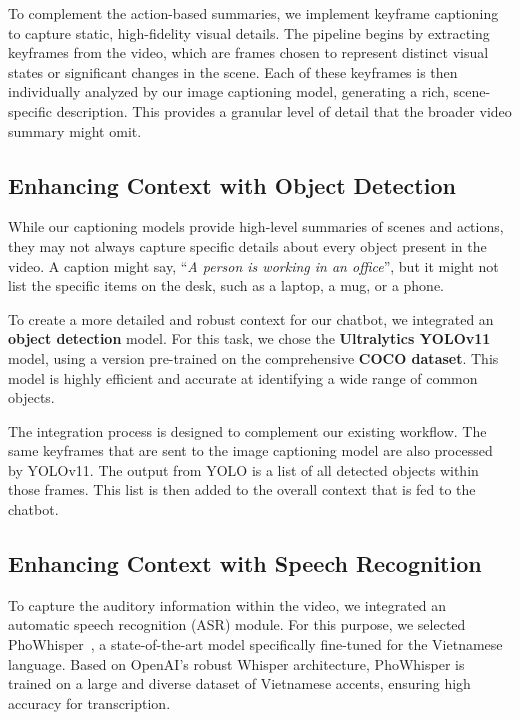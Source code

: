 To complement the action-based summaries, we implement keyframe captioning to capture static, high-fidelity visual details. The pipeline begins by extracting keyframes from the video, which are frames chosen to represent distinct visual states or significant changes in the scene. Each of these keyframes is then individually analyzed by our image captioning model, generating a rich, scene-specific description. This provides a granular level of detail that the broader video summary might omit.


\subsection{Enhancing Context with Object Detection}

While our captioning models provide high-level summaries of scenes and actions, they may not always capture specific details about every object present in the video. A caption might say, ``\textit{A person is working in an office}'', but it might not list the specific items on the desk, such as a laptop, a mug, or a phone.

To create a more detailed and robust context for our chatbot, we integrated an \textbf{object detection} model. For this task, we chose the \textbf{Ultralytics YOLOv11}~\cite{yolo11_ultralytics} model, using a version pre-trained on the comprehensive \textbf{COCO dataset}. This model is highly efficient and accurate at identifying a wide range of common objects.

The integration process is designed to complement our existing workflow. The same keyframes that are sent to the image captioning model are also processed by YOLOv11. The output from YOLO is a list of all detected objects within those frames. This list is then added to the overall context that is fed to the chatbot.


\subsection{Enhancing Context with Speech Recognition}

To capture the auditory information within the video, we integrated an automatic speech recognition (ASR) module. For this purpose, we selected PhoWhisper~\cite{le2024phowhisper}, a state-of-the-art model specifically fine-tuned for the Vietnamese language. Based on OpenAI's robust Whisper architecture, PhoWhisper is trained on a large and diverse dataset of Vietnamese accents, ensuring high accuracy for transcription.

